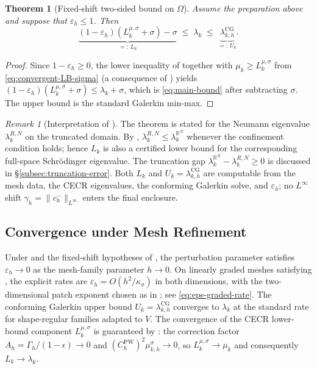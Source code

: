 \documentclass[11pt]{article}
\theoremstyle{plain}
\newtheorem{theorem}{Theorem}
\theoremstyle{definition}
\theoremstyle{remark}
\newtheorem{remark}{Remark}
\newcommand{\R}{\mathbb{R}}
\newcommand{\CG}{\mathrm{CG}}
\begin{document}
\begin{theorem}[Fixed-shift two-sided bound on $\Omega$]
\label{thm:main}
Assume the preparation above and suppose that $\varepsilon_h\le 1$.
Then
\begin{equation}
\label{eq:main-bound}
  \underbrace{(1-\varepsilon_h)(L_k^{\mu,\sigma}+\sigma)
    - \sigma}_{=:\,L_k}
  \;\le\; \lambda_k
  \;\le\;
  \underbrace{\lambda_{k,h}^{\CG}}_{=:\,U_k}.
\end{equation}
\end{theorem}

\begin{proof}
Since $1-\varepsilon_h\ge 0$, the lower inequality of
 together with $\mu_k\ge L_k^{\mu,\sigma}$
from \eqref{eq:convergent-LB-sigma} (a consequence of
) yields
$(1-\varepsilon_h)(L_k^{\mu,\sigma}+\sigma) \le
\lambda_k+\sigma$, which is \eqref{eq:main-bound} after subtracting
$\sigma$.  The upper bound is the standard Galerkin min-max.
\end{proof}

\begin{remark}[Interpretation of ]
\label{rmk:main-theorem-interpretation}
The theorem is stated for the Neumann eigenvalue $\lambda_k^{R,N}$ on
the truncated domain.  By ,
$\lambda_k^{R,N}\le\lambda_k^{\R^N}$ whenever the confinement condition
holds; hence $L_k$ is also a certified lower bound for the corresponding
full-space Schr\"odinger eigenvalue.  The truncation gap
$\lambda_k^{\R^N}-\lambda_k^{R,N}\ge0$ is discussed in
\S\ref{subsec:truncation-error}.  Both $L_k$ and
$U_k=\lambda_{k,h}^{\CG}$ are computable from the mesh data, the CECR
eigenvalues, the conforming Galerkin solve, and $\varepsilon_h$; no
$L^\infty$ shift $\gamma_h=\|c_h^-\|_{L^\infty}$ enters the final
enclosure.
\end{remark}

\subsection{Convergence under Mesh Refinement}
\label{subsec:convergence}

Under  and the fixed-shift
hypotheses of , the perturbation parameter satisfies
$\varepsilon_h\to 0$ as the mesh-family parameter $h\to 0$.
On linearly graded meshes satisfying , the explicit rates
are $\varepsilon_h=O(h^2/\kappa_\sigma)$ in both dimensions, with the
two-dimensional patch exponent chosen as in ; see
\eqref{eq:eps-graded-rate}.
The conforming Galerkin upper bound
$U_k=\lambda_{k,h}^{\CG}$ converges to $\lambda_k$ at the standard
rate for shape-regular families adapted to $V$. The convergence of
the CECR lower-bound component $L_k^{\mu,\sigma}$ is guaranteed by
: the correction factor
$A_h=\Gamma_h/(1{-}\epsilon)\to 0$ and
$(C_h^{\mathrm{PW}})^2\mu_{k,h}^\sigma\to 0$, so
$L_k^{\mu,\sigma}\to\mu_k$ and consequently $L_k\to\lambda_k$.
\end{document}

